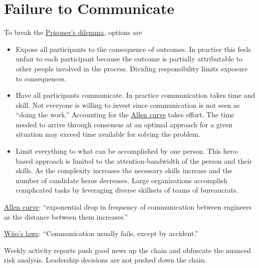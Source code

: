 \section{Failure to Communicate\label{sec:failure-to-comm}}

To break the \href{https://en.wikipedia.org/wiki/Prisoner\%27s\_dilemma}{Prisoner's dilemma}, options are 
\begin{itemize}
    \item Expose all participants to the consequence of outcomes. In practice this feels unfair to each participant because the outcome is partially attributable to other people involved in the process. Dividing responsibility limits exposure to consequences.
    \item Have all participants communicate. In practice communication takes time and skill. Not everyone is willing to invest since communication is not seen as ``doing the work.'' Accounting for the \href{https://en.wikipedia.org/wiki/Allen\_curve}{Allen curve} takes effort. The time needed to arrive through consensus at an optimal approach for a given situation may exceed time available for solving the problem.
    \item Limit everything to what can be accomplished by one person. This hero-based approach is limited to the attention-bandwidth of the person and their skills. As the complexity increases the necessary skills increase and the number of candidate heros decreases. Large organizations accomplish complicated tasks by leveraging diverse skillsets of teams of bureaucrats.

\end{itemize}


 
 
\href{https://en.wikipedia.org/wiki/Allen_curve}{Allen curve}: 
``exponential drop in frequency of communication between engineers as the distance between them increases.''

\href{https://en.wikipedia.org/wiki/Wiio\%27s_laws}{Wiio's laws}: 
``Communication usually fails, except by accident.''


Weekly activity reports push good news up the chain and obfuscate the nuanced risk analysis. 
Leadership decisions are not pushed down the chain.

